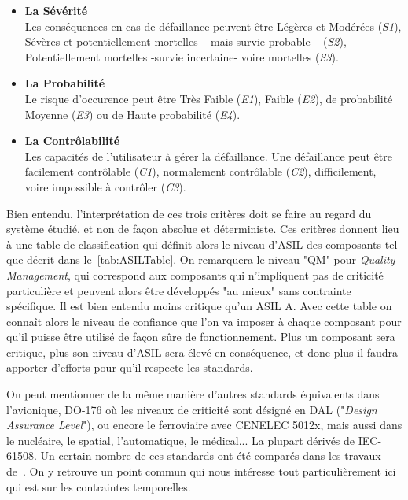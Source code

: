 \documentclass[french, a4paper, 11pt, twoside, pdftex]{StyleThese}
\begin{document}
		\begin{itemize}
			\item 		\textbf{La Sévérité}	\\
			Les conséquences en cas de défaillance peuvent être Légères et Modérées (\emph{S1}), Sévères et potentiellement mortelles -- mais survie probable -- (\emph{S2}), Potentiellement mortelles -survie incertaine- voire mortelles (\emph{S3}). 		
			\item 		\textbf{La Probabilité} 	\\
			Le risque d'occurence peut être Très Faible (\emph{E1}), Faible (\emph{E2}), de probabilité Moyenne (\emph{E3}) ou de Haute probabilité (\emph{E4}).
			\item 		\textbf{La Contrôlabilité}	\\
			Les capacités de l'utilisateur à gérer la défaillance. Une défaillance peut être facilement contrôlable (\emph{C1}), normalement contrôlable (\emph{C2}), difficilement, voire impossible à contrôler (\emph{C3}).
		\end{itemize}
		
		Bien entendu, l'interprétation de ces trois critères doit se faire au regard du système étudié, et non de façon absolue et déterministe. 
		Ces critères donnent lieu à une table de classification qui définit alors le niveau d'ASIL des composants tel que décrit dans le~\autoref{tab:ASILTable}. On remarquera le niveau "QM" pour \textit{Quality Management}, qui correspond aux composants qui n'impliquent pas de criticité particulière et peuvent alors être développés "au mieux" sans contrainte spécifique. Il est bien entendu moins critique qu'un ASIL A. Avec cette table on connaît alors le niveau de confiance que l'on va imposer à chaque composant pour qu'il puisse être utilisé de façon sûre de fonctionnement. Plus un composant sera critique, plus son niveau d'ASIL sera élevé en conséquence, et donc plus il faudra apporter d'efforts pour qu'il respecte les standards.
		
		On peut mentionner de la même manière d'autres standards équivalents dans l'avionique, DO-176 où les niveaux de criticité sont désigné en DAL ("\textit{Design Assurance Level}"), ou encore le ferroviaire avec CENELEC 5012x, mais aussi dans le nucléaire, le spatial, l'automatique, le médical... La plupart dérivés de IEC-61508.  Un certain nombre de ces standards ont été comparés dans les travaux de~\cite{baufreton_multi-domain_2010}. On y retrouve un point commun qui nous intéresse tout particulièrement ici qui est sur les contraintes temporelles.
\end{document}
